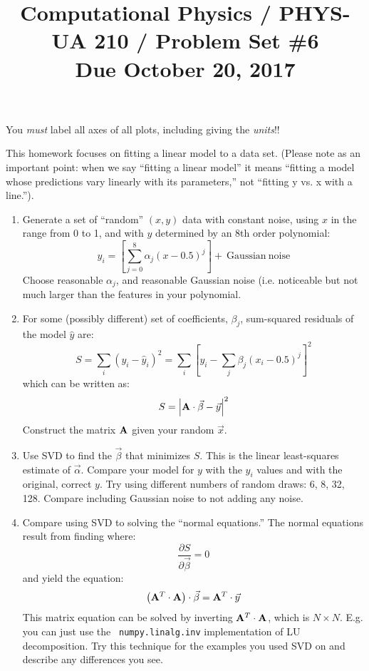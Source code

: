 \documentclass[11pt, preprint]{aastex}
\begin{document}
\title{\bf Computational Physics / PHYS-UA 210 / Problem Set \#6
\\ Due October 20, 2017 }

You {\it must} label all axes of all plots, including giving the {\it
  units}!!

This homework focuses on fitting a linear model to a data set.
(Please note as an important point: when we say ``fitting a linear
model'' it means ``fitting a model whose predictions vary linearly
with its parameters,'' not ``fitting y vs. x with a line.'').

\begin{enumerate}
\item Generate a set of ``random'' $(x,y)$ data with constant noise,
  using $x$ in the range from 0 to 1, and with $y$ determined by an
  8th order polynomial:
  \begin{equation}
 y_i = \left[\sum_{j=0}^8 \alpha_j (x-0.5)^j\right] +
 \mathrm{~Gaussian~noise}
  \end{equation}
  Choose reasonable $\alpha_j$, and reasonable Gaussian noise
  (i.e. noticeable but not much larger than the features in your
  polynomial. 
\item For some (possibly different) set of coefficients,
  $\beta_j$, sum-squared residuals of the model $\hat y$ are:
  \begin{equation}
    S = \sum_i (y_i - {\hat y}_i)^2 = \sum_i \left[y_i - \sum_j
      {\beta}_j (x_i - 0.5)^j\right]^2
  \end{equation}
  which can be written as:
  \begin{equation}
    S = \left|{\bf A}\cdot \vec{\beta} - \vec{y} \right|^2
  \end{equation}
  Construct the matrix ${\bf A}$ given your random $\vec{x}$.
\item Use SVD to find the $\vec{\beta}$ that minimizes $S$. This is
  the linear least-squares estimate of $\vec{\alpha}$. Compare your
  model for $y$ with the $y_i$ values and with the original, correct
  $y$.  Try using different numbers of random draws: 6, 8, 32, 128.
  Compare including Gaussian noise to not adding any noise.
\item Compare using SVD to solving the ``normal equations.'' 
  The normal equations result from finding where:
  \begin{equation}
    \frac{\partial S}{\partial \vec{\beta}} = 0
  \end{equation}
  and yield the equation:
  \begin{equation}
    \left({\bf A}^T\cdot {\bf A} \right)\cdot \vec{\beta} =
    {\bf A}^T\cdot\vec{y}
  \end{equation}
  This matrix equation can be solved by inverting ${\bf A}^T\cdot
  {\bf A}$, which is $N\times N$. E.g. you can just use the {\tt
    numpy.linalg.inv} implementation of LU decomposition. Try this
  technique for the examples you used SVD on and describe any
  differences you see.
\end{enumerate}
\end{document}
